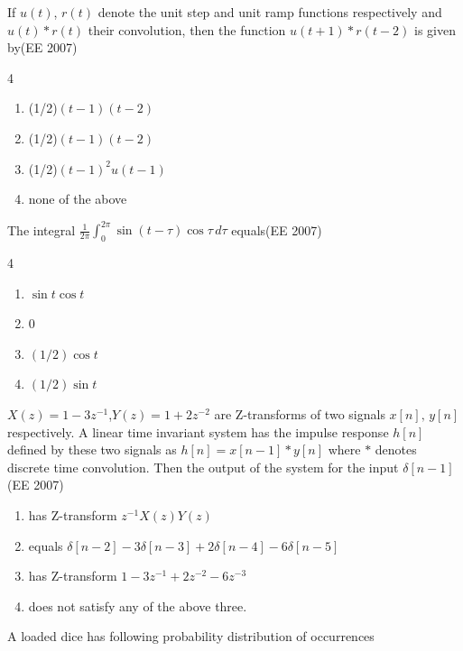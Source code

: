 \item \quad If $u(t)$, $r(t)$ denote the unit step and unit ramp functions respectively and $u(t)*r(t)$ their convolution, then the function $u(t+1)*r(t-2)$ is given by\hfill{(EE 2007)} 

\begin{multicols}{4}
\begin{enumerate} 
\item (1/2)$(t-1)(t-2)$
\item (1/2)$(t-1)(t-2)$
\item (1/2)$(t-1)^2u(t-1)$
\item none of the above
\end{enumerate}
\end{multicols}

\item The integral
$
\frac{1}{2\pi}\int_0^{2\pi}\sin(t-\tau)\cos\tau\, d\tau
$
equals\hfill{(EE 2007)} 

\begin{multicols}{4}
\begin{enumerate}
    \item $\sin t \cos t$
\item  $0$
\item  $(1/2) \cos t$
\item  $(1/2) \sin t$
\end{enumerate}
\end{multicols}

\vfill
{}
\newpage


\item  \quad $X(z) = 1 - 3z^{-1}$,\quad $Y(z) = 1 + 2z^{-2}$ are Z-transforms of two signals $x[n],\,y[n]$ respectively.
A linear time invariant system has the impulse response $h[n]$ defined by these two signals as
$
    h[n] = x[n-1] * y[n]
$
where $*$ denotes discrete time convolution. Then the output of the system for the input $\delta[n-1]$\hfill{(EE 2007)} 
\begin{enumerate}
    \item has Z-transform $z^{-1} X(z) Y(z)$
    \item equals $\delta[n-2] - 3\delta[n-3] + 2\delta[n-4] - 6\delta[n-5]$
    \item has Z-transform $1 - 3z^{-1} + 2z^{-2} - 6z^{-3}$
    \item does not satisfy any of the above three.
\end{enumerate}


\item  \quad A loaded dice has following probability distribution of occurrences

